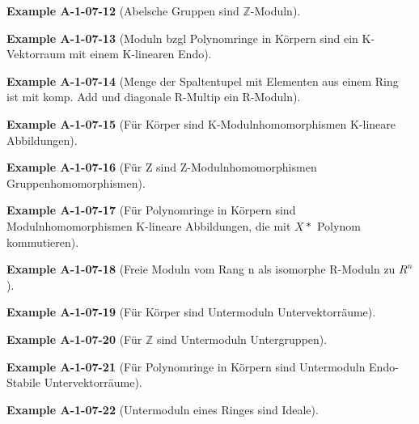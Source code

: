 \documentclass[10pt, letterpaper]{article}
\newcommand{\Z}{\mathbb{Z}}
\newcommand{\CustomHeading}[3]{%
  \par\medskip\noindent%
  \textbf{#1 #2} \textnormal{(#3)}.\enskip%
}
\newenvironment{EXA}[2]{\CustomHeading{Example}{#1}{#2}}{}
\begin{document}
\begin{EXA}{A-1-07-12}{Abelsche Gruppen sind $\Z$-Moduln}
\end{EXA}

\begin{EXA}{A-1-07-13}{Moduln bzgl Polynomringe in Körpern sind ein K-Vektorraum mit einem K-linearen Endo}
\end{EXA}

\begin{EXA}{A-1-07-14}{Menge der Spaltentupel mit Elementen aus einem Ring ist mit komp. Add und diagonale R-Multip ein R-Moduln}
\end{EXA}

\begin{EXA}{A-1-07-15}{Für Körper sind K-Modulnhomomorphismen K-lineare Abbildungen}
\end{EXA}

\begin{EXA}{A-1-07-16}{Für Z sind Z-Modulnhomomorphismen Gruppenhomomorphismen}
\end{EXA}

\begin{EXA}{A-1-07-17}{Für Polynomringe in Körpern sind Modulnhomomorphismen K-lineare Abbildungen, die mit $X*$ Polynom kommutieren}
\end{EXA}

\begin{EXA}{A-1-07-18}{Freie Moduln vom Rang n als isomorphe R-Moduln zu $R^n$}
\end{EXA}

\begin{EXA}{A-1-07-19}{Für Körper sind Untermoduln Untervektorräume}
\end{EXA}

\begin{EXA}{A-1-07-20}{Für $\Z$ sind Untermoduln Untergruppen}
\end{EXA}

\begin{EXA}{A-1-07-21}{Für Polynomringe in Körpern sind Untermoduln Endo-Stabile Untervektorräume}
\end{EXA}

\begin{EXA}{A-1-07-22}{Untermoduln eines Ringes sind Ideale}
\end{EXA}
\end{document}
